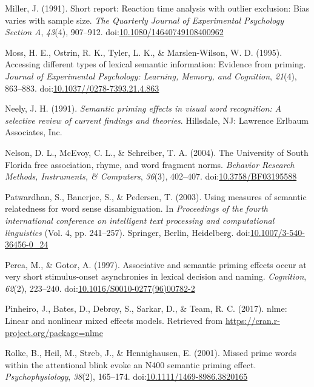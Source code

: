 \documentclass[english,man]{apa6}
\theoremstyle{definition}
\theoremstyle{definition}
\theoremstyle{definition}
\theoremstyle{remark}
\begin{document}
\hypertarget{ref-Miller1991}{}
Miller, J. (1991). Short report: Reaction time analysis with outlier
exclusion: Bias varies with sample size. \emph{The Quarterly Journal of
Experimental Psychology Section A}, \emph{43}(4), 907--912.
doi:\href{https://doi.org/10.1080/14640749108400962}{10.1080/14640749108400962}

\hypertarget{ref-Moss1995}{}
Moss, H. E., Ostrin, R. K., Tyler, L. K., \& Marslen-Wilson, W. D.
(1995). Accessing different types of lexical semantic information:
Evidence from priming. \emph{Journal of Experimental Psychology:
Learning, Memory, and Cognition}, \emph{21}(4), 863--883.
doi:\href{https://doi.org/10.1037//0278-7393.21.4.863}{10.1037//0278-7393.21.4.863}

\hypertarget{ref-Neely1991}{}
Neely, J. H. (1991). \emph{Semantic priming effects in visual word
recognition: A selective review of current findings and theories}.
Hillsdale, NJ: Lawrence Erlbaum Associates, Inc.

\hypertarget{ref-Nelson2004}{}
Nelson, D. L., McEvoy, C. L., \& Schreiber, T. A. (2004). The University
of South Florida free association, rhyme, and word fragment norms.
\emph{Behavior Research Methods, Instruments, \& Computers},
\emph{36}(3), 402--407.
doi:\href{https://doi.org/10.3758/BF03195588}{10.3758/BF03195588}

\hypertarget{ref-Patwardhan2003}{}
Patwardhan, S., Banerjee, S., \& Pedersen, T. (2003). Using measures of
semantic relatedness for word sense disambiguation. In \emph{Proceedings
of the fourth international conference on intelligent text processing
and computational linguistics} (Vol. 4, pp. 241--257). Springer, Berlin,
Heidelberg.
doi:\href{https://doi.org/10.1007/3-540-36456-0_24}{10.1007/3-540-36456-0\_24}

\hypertarget{ref-Perea1997}{}
Perea, M., \& Gotor, A. (1997). Associative and semantic priming effects
occur at very short stimulus-onset asynchronies in lexical decision and
naming. \emph{Cognition}, \emph{62}(2), 223--240.
doi:\href{https://doi.org/10.1016/S0010-0277(96)00782-2}{10.1016/S0010-0277(96)00782-2}

\hypertarget{ref-Pinheiro2017}{}
Pinheiro, J., Bates, D., Debroy, S., Sarkar, D., \& Team, R. C. (2017).
nlme: Linear and nonlinear mixed effects models. Retrieved from
\url{https://cran.r-project.org/package=nlme}

\hypertarget{ref-Rolke2001}{}
Rolke, B., Heil, M., Streb, J., \& Hennighausen, E. (2001). Missed prime
words within the attentional blink evoke an N400 semantic priming
effect. \emph{Psychophysiology}, \emph{38}(2), 165--174.
doi:\href{https://doi.org/10.1111/1469-8986.3820165}{10.1111/1469-8986.3820165}
\end{document}
